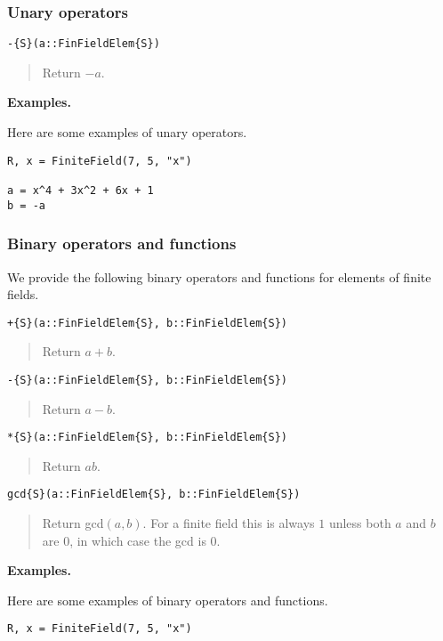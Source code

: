 \documentclass[a4paper,10pt]{article}
\newcommand{\desc}[1]{\vspace{-3mm}\begin{quote}#1\end{quote}}
\begin{document}
{{\subsubsection{Unary operators}

\begin{lstlisting}
-{S}(a::FinFieldElem{S})
\end{lstlisting}

\desc{Return $-a$.}

\textbf{Examples.}

Here are some examples of unary operators.

\begin{lstlisting}
R, x = FiniteField(7, 5, "x")

a = x^4 + 3x^2 + 6x + 1
b = -a
\end{lstlisting}

\subsubsection{Binary operators and functions}

We provide the following binary operators and functions for elements of
finite fields.

\begin{lstlisting}
+{S}(a::FinFieldElem{S}, b::FinFieldElem{S})
\end{lstlisting}

\desc{Return $a + b$.}

\begin{lstlisting}
-{S}(a::FinFieldElem{S}, b::FinFieldElem{S})
\end{lstlisting}

\desc{Return $a - b$.}

\begin{lstlisting}
*{S}(a::FinFieldElem{S}, b::FinFieldElem{S})
\end{lstlisting}

\desc{Return $ab$.}

\begin{lstlisting}
gcd{S}(a::FinFieldElem{S}, b::FinFieldElem{S})
\end{lstlisting}

\desc{Return gcd$(a, b)$. For a finite field this is always $1$ unless both
$a$ and $b$ are $0$, in which case the gcd is $0$.}

\textbf{Examples.}

Here are some examples of binary operators and functions.

\begin{lstlisting}
R, x = FiniteField(7, 5, "x")


\end{lstlisting}}}
\end{document}
